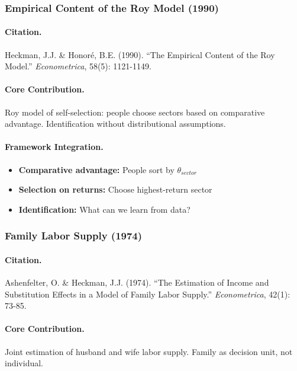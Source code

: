 \subsubsection{Empirical Content of the Roy Model (1990)}

\paragraph{Citation.}
Heckman, J.J. \& Honor\'e, B.E. (1990). ``The Empirical Content of the
Roy Model.'' \emph{Econometrica}, 58(5): 1121-1149.

\paragraph{Core Contribution.}
Roy model of self-selection: people choose sectors based on
comparative advantage. Identification without distributional assumptions.

\paragraph{Framework Integration.}
\begin{itemize}
  \item \textbf{Comparative advantage:} People sort by $\theta_{sector}$
  \item \textbf{Selection on returns:} Choose highest-return sector
  \item \textbf{Identification:} What can we learn from data?
\end{itemize}

\subsubsection{Family Labor Supply (1974)}

\paragraph{Citation.}
Ashenfelter, O. \& Heckman, J.J. (1974). ``The Estimation of Income and
Substitution Effects in a Model of Family Labor Supply.''
\emph{Econometrica}, 42(1): 73-85.

\paragraph{Core Contribution.}
Joint estimation of husband and wife labor supply. Family as
decision unit, not individual.

